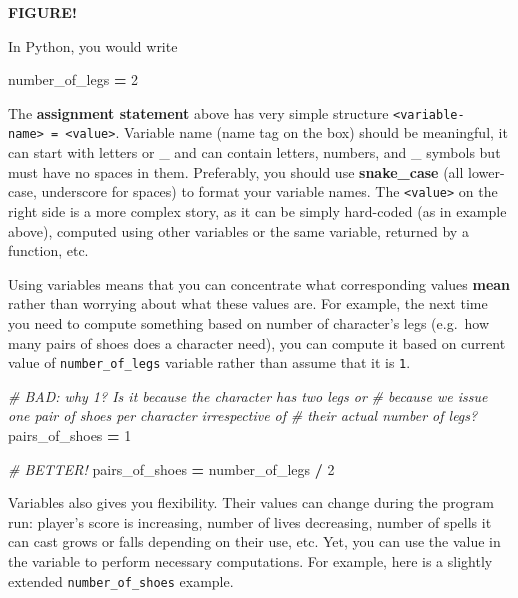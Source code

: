 \documentclass[
]{book}
\newenvironment{Shaded}{\begin{snugshade}}{\end{snugshade}}
\newcommand{\CommentTok}[1]{\textcolor[rgb]{0.56,0.35,0.01}{\textit{#1}}}
\newcommand{\DecValTok}[1]{\textcolor[rgb]{0.00,0.00,0.81}{#1}}
\newcommand{\NormalTok}[1]{#1}
\newcommand{\OperatorTok}[1]{\textcolor[rgb]{0.81,0.36,0.00}{\textbf{#1}}}
\begin{document}
\textbf{FIGURE!}

In Python, you would write

\begin{Shaded}
\begin{Highlighting}[]
\NormalTok{number\_of\_legs }\OperatorTok{=} \DecValTok{2}
\end{Highlighting}
\end{Shaded}

The \textbf{assignment statement} above has very simple structure \texttt{\textless{}variable-name\textgreater{}\ =\ \textless{}value\textgreater{}}. Variable name (name tag on the box) should be meaningful, it can start with letters or \_ and can contain letters, numbers, and \_ symbols but must have no spaces in them. Preferably, you should use \textbf{snake\_case} (all lower-case, underscore for spaces) to format your variable names. The \texttt{\textless{}value\textgreater{}} on the right side is a more complex story, as it can be simply hard-coded (as in example above), computed using other variables or the same variable, returned by a function, etc.

Using variables means that you can concentrate what corresponding values \textbf{mean} rather than worrying about what these values are. For example, the next time you need to compute something based on number of character's legs (e.g.~how many pairs of shoes does a character need), you can compute it based on current value of \texttt{number\_of\_legs} variable rather than assume that it is \texttt{1}.

\begin{Shaded}
\begin{Highlighting}[]
\CommentTok{\# BAD: why 1? Is it because the character has two legs or}
\CommentTok{\# because we issue one pair of shoes per character irrespective of}
\CommentTok{\# their actual number of legs?}
\NormalTok{pairs\_of\_shoes }\OperatorTok{=} \DecValTok{1}

\CommentTok{\# BETTER!}
\NormalTok{pairs\_of\_shoes }\OperatorTok{=}\NormalTok{ number\_of\_legs }\OperatorTok{/} \DecValTok{2}
\end{Highlighting}
\end{Shaded}

Variables also gives you flexibility. Their values can change during the program run: player's score is increasing, number of lives decreasing, number of spells it can cast grows or falls depending on their use, etc. Yet, you can use the value in the variable to perform necessary computations. For example, here is a slightly extended \texttt{number\_of\_shoes} example.
\end{document}
